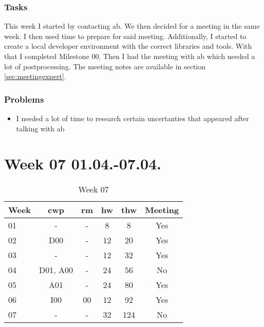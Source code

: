 \subsubsection{Tasks}

This week I started by contacting \gls{ab}. We then decided for a meeting in the same week. I then used time to prepare for said meeting. Additionally, I started to create a local developer environment with the correct libraries and tools. With that I completed Milestone 00. Then I had the meeting with \gls{ab} which needed a lot of postprocessing. The meeting notes are available in section \ref{sec:meetingexpert}.

\subsubsection{Problems}

\begin{itemize}
    \item I needed a lot of time to research certain uncertanties that appeared after talking with \gls{ab}
\end{itemize}


\section{Week 07 01.04.-07.04.}
\label{sec:journal:week07}

\begin{table}[!ht]
    \begin{center}
        \caption{Week 07}
        \label{tab:journal:week07}
        \begin{tabular}{l|c|c|c|c|c}
            \textbf{Week} & \textbf{\gls{cwp}} & \textbf{\gls{rm}} & \textbf{\gls{hw}} & \textbf{\gls{thw}} & \textbf{Meeting}\\
        \hline
        01 & - & - & 8 & 8 & Yes \\
        02 & D00 & - & 12 & 20 & Yes \\
        03 & - & - & 12 & 32 & Yes \\
        04 & D01, A00 & - & 24 & 56 & No \\
        05 & A01 & - & 24 & 80 & Yes \\
        06 & I00 & 00 & 12 & 92 & Yes \\
        07 & - & - & 32 & 124 & No \\
        \end{tabular}
    \end{center}
\end{table}

